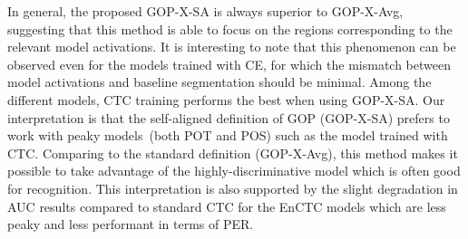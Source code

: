 In general, the proposed GOP-X-SA is always superior to GOP-X-Avg, suggesting that this method is able to focus on the regions corresponding to the relevant model activations.
It is interesting to note that this phenomenon can be observed even for the models trained with CE, for which the mismatch between model activations and baseline segmentation should be minimal.
Among the different models, CTC training performs the best when using GOP-X-SA.
Our interpretation is that the  self-aligned definition of GOP (GOP-X-SA) prefers to work with peaky models~(both POT and POS) such as the model trained with CTC. 
Comparing to the standard definition (GOP-X-Avg), this method makes it possible to take advantage of the highly-discriminative model which is often good for recognition.
This interpretation is also supported by the slight degradation in AUC results compared to standard CTC for the EnCTC models which are less peaky and less performant in terms of PER.
